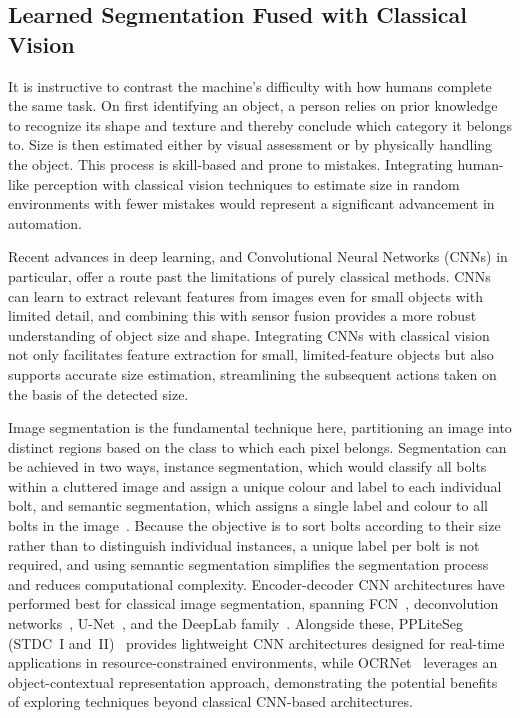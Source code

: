 \subsection{Learned Segmentation Fused with Classical Vision}\label{subsec:intro_learned_vision}

It is instructive to contrast the machine's difficulty with how humans complete the same task. On
first identifying an object, a person relies on prior knowledge to recognize its shape and texture
and thereby conclude which category it belongs to. Size is then estimated either by visual
assessment or by physically handling the object. This process is skill-based and prone to mistakes.
Integrating human-like perception with classical vision techniques to estimate size in random
environments with fewer mistakes would represent a significant advancement in
automation.

Recent advances in deep learning, and Convolutional Neural Networks (CNNs) in particular, offer a
route past the limitations of purely classical methods. CNNs can learn to extract relevant features
from images even for small objects with limited detail, and combining this with sensor fusion
provides a more robust understanding of object size and shape. Integrating CNNs with classical
vision not only facilitates feature extraction for small, limited-feature objects but also supports
accurate size estimation, streamlining the subsequent actions taken on the basis of the detected
size.

Image segmentation is the fundamental technique here, partitioning an image into distinct regions
based on the class to which each pixel belongs. Segmentation can be achieved in two ways, instance
segmentation, which would classify all bolts within a cluttered image and assign a unique colour and
label to each individual bolt, and semantic segmentation, which assigns a single label and colour to
all bolts in the image~\citep{yin2022bridging}. Because the objective is to sort bolts according to
their size rather than to distinguish individual instances, a unique label per bolt is not required,
and using semantic segmentation simplifies the segmentation process and reduces computational
complexity. Encoder-decoder CNN architectures have performed best for
classical image segmentation, spanning FCN~\citep{long2015fully}, deconvolution
networks~\citep{noh2015learning}, U-Net~\citep{ronneberger2015unet}, and the DeepLab
family~\citep{mo2022review}. Alongside these, PPLiteSeg (STDC~I and~II)~\citep{peng2022ppliteseg}
provides lightweight CNN architectures designed for real-time applications in resource-constrained
environments, while OCRNet~\citep{yuan2020ocrnet} leverages an object-contextual representation
approach, demonstrating the potential benefits of exploring techniques beyond classical CNN-based
architectures.


